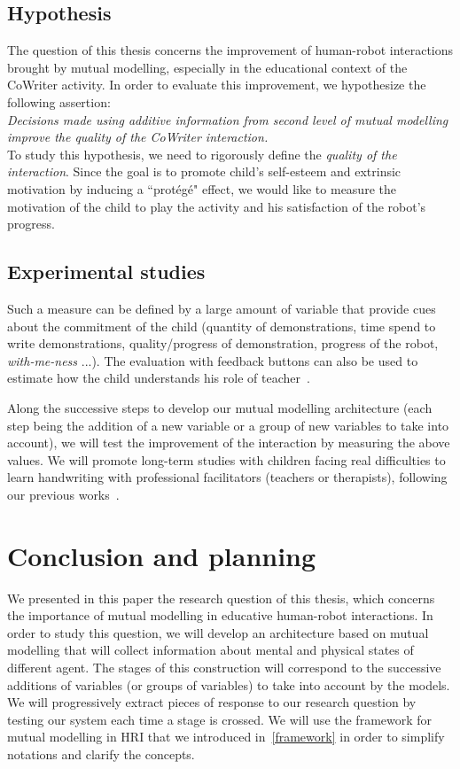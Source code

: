 \documentclass[10pt,a4paper]{article}
\begin{document}
\subsection{Hypothesis}

The question of this thesis concerns the improvement of human-robot interactions brought by mutual modelling, especially in the educational context of the CoWriter activity. In order to evaluate this improvement, we hypothesize the following assertion:\\
\textit{Decisions made using additive information from second level of mutual modelling improve the quality of the CoWriter interaction.}\\
To study this hypothesis, we need to rigorously define the \textit{quality of the interaction}. Since the goal is to promote child's self-esteem and extrinsic motivation by inducing a ``prot\'eg\'e" effect, we would like to measure the motivation of the child to play the activity and his satisfaction of the robot's progress.

\subsection{Experimental studies}

Such a measure can be defined by a large amount of variable that provide cues about the commitment of the child (quantity of demonstrations, time spend to write demonstrations, quality/progress of demonstration, progress of the robot, \textit{with-me-ness} ...). The evaluation with feedback buttons can also be used to estimate how the child understands his role of teacher~\cite{jacq2016building}. 

Along the successive steps to develop our mutual modelling architecture (each step being the addition of a new variable or a group of new variables to take into account), we will test the improvement of the interaction by measuring the above values. We will promote long-term studies with children facing real difficulties to learn handwriting with professional facilitators (teachers or therapists), following our previous works~\cite{jacq2016building}. 

\section{Conclusion and planning}

We presented in this paper the research question of this thesis, which concerns the importance of mutual modelling in educative human-robot interactions. In order to study this question, we will develop an architecture based on mutual modelling that will collect information about mental and physical states of different agent. The stages of this construction will correspond to the successive additions of variables (or groups of variables) to take into account by the models. We will progressively extract pieces of response to our research question by testing our system each time a stage is crossed. We will use the framework for mutual modelling in HRI that we introduced in~\ref{framework} in order to simplify notations and clarify the concepts. 
\end{document}
